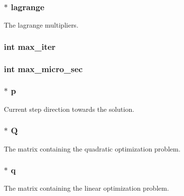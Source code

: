 \subsubsection[{lagrange}]{$\ast$ lagrange}\label{structproblem_a988084bf1423637718de8882244149f4}
The lagrange multipliers. \hypertarget{structproblem_a53380b3b14c20bdfcb3bc9970c421231}{}
\subsubsection[{max\+\_\+iter}]{\setlength{\rightskip}{0pt plus 5cm}int max\+\_\+iter}\label{structproblem_a53380b3b14c20bdfcb3bc9970c421231}
\hypertarget{structproblem_af471c126183533a7a418a166768af42d}{}
\subsubsection[{max\+\_\+micro\+\_\+sec}]{\setlength{\rightskip}{0pt plus 5cm}int max\+\_\+micro\+\_\+sec}\label{structproblem_af471c126183533a7a418a166768af42d}
\hypertarget{structproblem_a0b8e7c785036ef0cb64a801257094918}{}
\subsubsection[{p}]{$\ast$ p}\label{structproblem_a0b8e7c785036ef0cb64a801257094918}
Current step direction towards the solution. \hypertarget{structproblem_ae50fecd2794ca5844d6d01efcf17294c}{}
\subsubsection[{Q}]{$\ast$ Q}\label{structproblem_ae50fecd2794ca5844d6d01efcf17294c}
The matrix containing the quadratic optimization problem. \hypertarget{structproblem_a7755407fcbd4345b31d64bbc181af35a}{}
\subsubsection[{q}]{$\ast$ q}\label{structproblem_a7755407fcbd4345b31d64bbc181af35a}
The matrix containing the linear optimization problem. \hypertarget{structproblem_a54cc974fe14b21225c2a940ed2bf1039}{}
